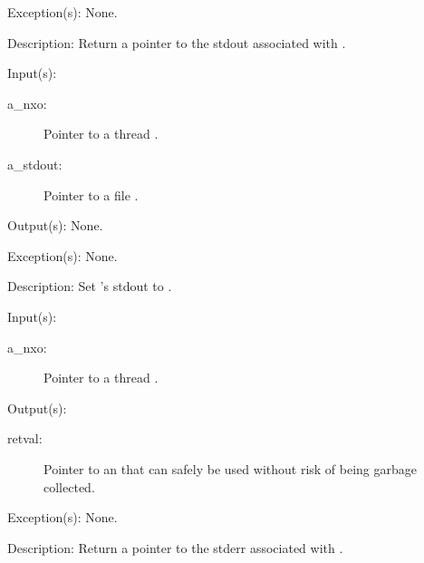 \begin{capi}
\begin{capilist}
\begin{description}
		\end{description}
	\item[Exception(s): ] None.
	\item[Description: ]
		Return a pointer to the stdout associated with .
	\end{capilist}
\label{nxo_thread_stdout_set}
	\begin{capilist}
	\item[Input(s): ]
		\begin{description}\item[]
		\item[a\_nxo: ]
			Pointer to a thread .
		\item[a\_stdout: ]
			Pointer to a file .
		\end{description}
	\item[Output(s): ] None.
	\item[Exception(s): ] None.
	\item[Description: ]
		Set 's stdout to .
	\end{capilist}
\label{nxo_thread_stderr_get}
	\begin{capilist}
	\item[Input(s): ]
		\begin{description}\item[]
		\item[a\_nxo: ]
			Pointer to a thread \classname{nxo}.
		\end{description}
	\item[Output(s): ]
		\begin{description}\item[]
		\item[retval: ]
			Pointer to an  that can safely be used
			without risk of being garbage collected.
		\end{description}
	\item[Exception(s): ] None.
	\item[Description: ]
		Return a pointer to the stderr associated with \cvar{a\_nxo}.
	\end{capilist}
\label{nxo_thread_stderr_set}
\end{capi}
